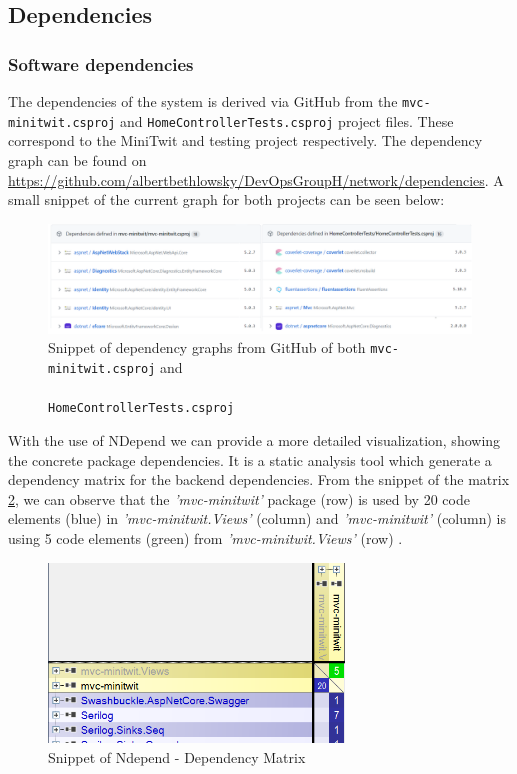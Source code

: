 \documentclass{article}
\begin{document}
\subsection{Dependencies}
\subsubsection{Software dependencies}

The dependencies of the system is derived via GitHub from the \texttt{mvc-minitwit.csproj} 
and \texttt{HomeControllerTests.csproj} project files. These correspond to the MiniTwit and testing project respectively. The dependency graph can be found on \url{https://github.com/albertbethlowsky/DevOpsGroupH/network/dependencies}. A small snippet of the current graph for both projects can be seen below:
\begin{figure}[H]
\centering
\includegraphics[width=1.1\textwidth]{images/dependencies-snip.png}
\caption{\label{fig:dep1}Snippet of dependency graphs from GitHub of both \texttt{mvc-minitwit.csproj} and \\\\ \texttt{HomeControllerTests.csproj}}
\end{figure}

With the use of NDepend we can provide a more detailed visualization, showing the concrete package dependencies. It is a static analysis tool which generate a dependency matrix for the backend dependencies. From the snippet of the matrix \ref{fig:matrix}, we can observe that the \emph{'mvc-minitwit'} package (row) is used by 20 code elements (blue) in \emph{'mvc-minitwit.Views'} (column) and \emph{'mvc-minitwit'} (column) is using 5 code elements (green) from \emph{'mvc-minitwit.Views'} (row) \cite{Ndepend}.
\begin{figure}[H]
\centering
\includegraphics[width=0.7\textwidth]{images/ndepenmatrix.png}
\caption{\label{fig:matrix} Snippet of Ndepend - Dependency Matrix}
\end{figure}
\end{document}
